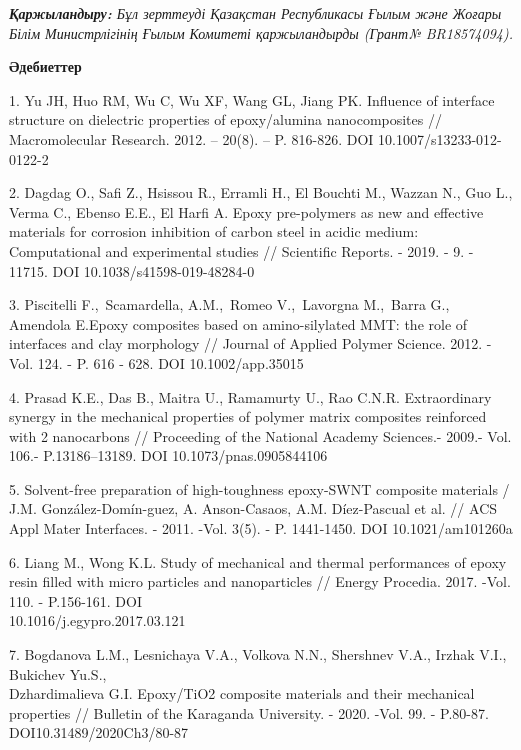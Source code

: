 \begin{multicols}{2}
\emph{{\bfseries Қаржыландыру:} Бұл зерттеуді Қазақстан Республикасы Ғылым
және Жоғары Білім Министрлігінің Ғылым Комитеті қаржыландырды (Грант№
BR18574094).}
\end{multicols}

\begin{center}
{\bfseries Әдебиеттер}
\end{center}

\begin{references}
1. Yu JH, Huo RM, Wu C, Wu XF, Wang GL, Jiang PK.
Influence of interface structure on dielectric properties of epoxy/alumina nanocomposites
// Macromolecular Research. 2012. -- 20(8). -- P. 816-826. DOI
10.1007/s13233-012-0122-2

2. Dagdag O., Safi Z., Hsissou R., Erramli H., El Bouchti M., Wazzan N.,
Guo L., Verma C., Ebenso E.E., El Harfi A. Epoxy pre-polymers as new
and effective materials for corrosion inhibition of carbon steel in
acidic medium: Computational and experimental studies // Scientific
Reports. - 2019. - 9. - 11715. DOI 10.1038/s41598-019-48284-0

3. Piscitelli F.,~Scamardella, A.M.,~Romeo V.,~Lavorgna M.,~Barra G.,
Amendola E.Epoxy composites based on amino-silylated MMT: the role of
interfaces and clay morphology // Journal of Applied Polymer Science.
2012. - Vol. 124. - P. 616 - 628. DOI 10.1002/app.35015

4. Prasad K.E., Das B., Maitra U., Ramamurty U., Rao C.N.R. Extraordinary
synergy in the mechanical properties of polymer matrix composites
reinforced with 2 nanocarbons // Proceeding of the National Academy
Sciences.- 2009.- Vol. 106.- P.13186--13189. DOI 10.1073/pnas.0905844106

5. Solvent-free preparation of high-toughness epoxy-SWNT composite
materials / J.M. González-Domín-guez, A. Anson-Casaos, A.M.
Díez-Pascual et al. // ACS Appl Mater Interfaces. - 2011. -Vol. 3(5).
- P. 1441-1450. DOI 10.1021/am101260a

6. Liang M., Wong K.L. Study of mechanical and thermal performances of
epoxy resin filled with micro particles and nanoparticles // Energy
Procedia. 2017. -Vol. 110. - P.156-161. DOI
\\10.1016/j.egypro.2017.03.121

7. Bogdanova L.M., Lesnichaya V.A., Volkova N.N., Shershnev V.A., Irzhak
V.I., Bukichev Yu.S., \\Dzhardimalieva G.I. Epoxy/TiO2 composite
materials and their mechanical properties // Bulletin of the Karaganda
University. - 2020. -Vol. 99. - P.80-87. DOI10.31489/2020Ch3/80-87


\end{references}

